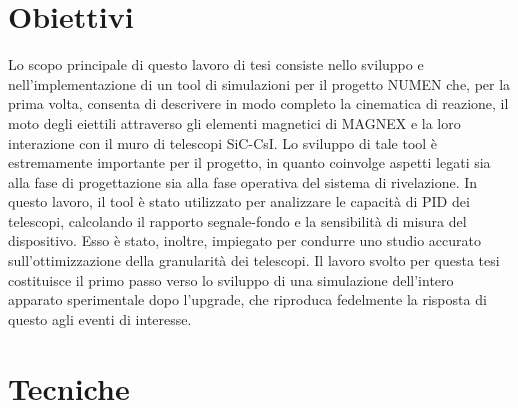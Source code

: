 \documentclass[10pt,foldmark,notumble]{leaflet}
\newcommand{\geant}{Geant4}
\begin{document}
\section{Obiettivi}

Lo scopo principale di questo lavoro di tesi consiste nello sviluppo e nell'implementazione di un tool di simulazioni per il progetto NUMEN che, per la prima volta, consenta di descrivere in modo completo la cinematica di reazione, il moto degli eiettili attraverso gli elementi magnetici di MAGNEX e la loro interazione con il muro di telescopi SiC-CsI.
Lo sviluppo di tale tool è estremamente importante per il progetto, in quanto coinvolge aspetti legati sia alla fase di progettazione sia alla fase operativa del sistema di rivelazione.
In questo lavoro, il tool è stato utilizzato per analizzare le capacità di PID dei telescopi, calcolando il rapporto segnale-fondo e la sensibilità di misura del dispositivo.
Esso è stato, inoltre, impiegato per condurre uno studio accurato sull'ottimizzazione della granularità dei telescopi.
Il lavoro svolto per questa tesi costituisce il primo passo verso lo sviluppo di una simulazione dell'intero apparato sperimentale dopo l'upgrade, che riproduca fedelmente la risposta di questo agli eventi di interesse.






\section{Tecniche}
\end{document}
